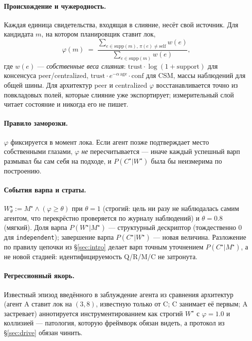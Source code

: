 \documentclass{article}
\newcommand{\method}[1]{\texttt{#1}}
\newcommand{\wstar}{W^{\star}}
\newcommand{\mstar}{M^{\star}}
\newcommand{\cstar}{C^{\star}}
\begin{document}
\paragraph{Происхождение и чужеродность.} Каждая единица
свидетельства, входящая в слияние, несёт свой источник. Для
кандидата $m$, на котором планировщик ставит лок,
\[
\varphi(m) \;=\;
\frac{\sum_{e\in\mathrm{supp}(m),\,\pi(e)\neq\mathrm{self}} w(e)}
     {\sum_{e\in\mathrm{supp}(m)} w(e)},
\]
где $w(e)$ --- \emph{собственные веса слияния}: $\text{trust}\cdot
\log(1{+}\text{support})$ для консенсуса peer/centralized,
$\text{trust}\cdot e^{-\alpha\,\text{age}}\cdot\text{conf}$ для CSM,
массы наблюдений для общей шины. Для архитектур peer и centralized
$\varphi$ восстанавливается точно из повкладовых полей, которые
слияние уже экспортирует; измерительный слой читает состояние и
никогда его не пишет.

\paragraph{Правило заморозки.} $\varphi$ фиксируется в момент лока.
Если агент позже подтверждает место собственными глазами, $\varphi$
\emph{не} пересчитывается --- иначе каждый успешный варп размывал бы
сам себя на подходе, и $P(\cstar|\wstar)$ была бы неизмерима по
построению.

\paragraph{События варпа и страты.} $\wstar_\theta := \mstar \wedge
(\varphi\ge\theta)$ при $\theta{=}1$ (строгий: цель ни разу не
наблюдалась самим агентом, что перекрёстно проверяется по журналу
наблюдений) и $\theta{=}0.8$ (мягкий). Доля варпа $P(\wstar|\mstar)$
--- структурный дескриптор (тождественно $0$ для
\method{independent}); завершение варпа $P(\cstar|\wstar)$ --- новая
величина. Разложение по правилу цепочки из \S\ref{sec:intro} делает
варп точным уточнением $P(\cstar|\mstar)$, а не новой стадией:
идентифицируемость Q/R/M/C не затронута.

\paragraph{Регрессионный якорь.} Известный эпизод введённого в
заблуждение агента из сравнения архитектур (агент A ставит лок на
$(3,8)$, известную только от C; C занимает её первым; A застревает)
аннотируется инструментированием как строгий $\wstar$ с
$\varphi=1.0$ и коллизией --- патология, которую фреймворк обязан
видеть, а протокол из \S\ref{sec:drive} обязан чинить.
\end{document}
